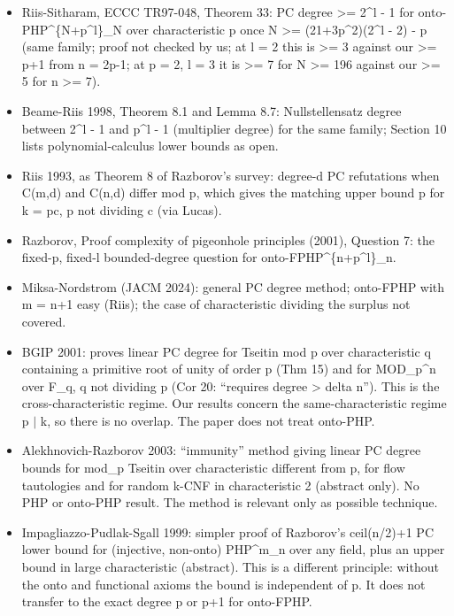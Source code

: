\documentclass{article}
\begin{document}
\begin{itemize}
\item Riis-Sitharam, ECCC TR97-048, Theorem 33: PC degree \textgreater{}= 2\textasciicircum{}l - 1 for onto-PHP\textasciicircum{}\{N+p\textasciicircum{}l\}\_N over characteristic p once N \textgreater{}= (21+3p\textasciicircum{}2)(2\textasciicircum{}l - 2) - p (same family; proof not checked by us; at l = 2 this is \textgreater{}= 3 against our \textgreater{}= p+1 from n = 2p-1; at p = 2, l = 3 it is \textgreater{}= 7 for N \textgreater{}= 196 against our \textgreater{}= 5 for n \textgreater{}= 7).
\item Beame-Riis 1998, Theorem 8.1 and Lemma 8.7: Nullstellensatz degree between 2\textasciicircum{}l - 1 and p\textasciicircum{}l - 1 (multiplier degree) for the same family; Section 10 lists polynomial-calculus lower bounds as open.
\item Riis 1993, as Theorem 8 of Razborov's survey: degree-d PC refutations when C(m,d) and C(n,d) differ mod p, which gives the matching upper bound p for k = pc, p not dividing c (via Lucas).
\item Razborov, Proof complexity of pigeonhole principles (2001), Question 7: the fixed-p, fixed-l bounded-degree question for onto-FPHP\textasciicircum{}\{n+p\textasciicircum{}l\}\_n.
\item Miksa-Nordstrom (JACM 2024): general PC degree method; onto-FPHP with m = n+1 easy (Riis); the case of characteristic dividing the surplus not covered.
\item BGIP 2001: proves linear PC degree for Tseitin mod p over characteristic q containing a primitive root of unity of order p (Thm 15) and for MOD\_p\textasciicircum{}n over F\_q, q not dividing p (Cor 20: ``requires degree \textgreater{} delta n''). This is the cross-characteristic regime. Our results concern the same-characteristic regime p $\mid$ k, so there is no overlap. The paper does not treat onto-PHP.
\item Alekhnovich-Razborov 2003: ``immunity'' method giving linear PC degree bounds for mod\_p Tseitin over characteristic different from p, for flow tautologies and for random k-CNF in characteristic 2 (abstract only). No PHP or onto-PHP result. The method is relevant only as possible technique.
\item Impagliazzo-Pudlak-Sgall 1999: simpler proof of Razborov's ceil(n/2)+1 PC lower bound for (injective, non-onto) PHP\textasciicircum{}m\_n over any field, plus an upper bound in large characteristic (abstract). This is a different principle: without the onto and functional axioms the bound is independent of p. It does not transfer to the exact degree p or p+1 for onto-FPHP.

\end{itemize}
\end{document}
